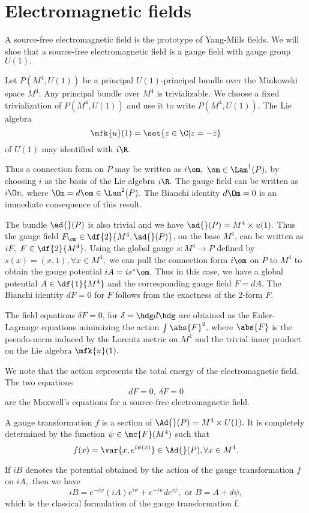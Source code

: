 \section{Electromagnetic fields}

A source-free electromagnetic field is the prototype of Yang-Mills fields. We will shoe that a source-free
electromagnetic field is a gauge field with gauge group $U(1).$

Let $P(M^{4}, U(1))$ be a principal $U(1)$-principal bundle over the Minkowski space $M^{4}.$ Any principal bundle over
$M^{4}$ is trivializable. We choose a fixed trivialization of $P(M^{4},U(1))$ and use it to write $P(M^{4}, U(1)).$ The
Lie algebra
$$
\mfk{u}(1)=\set{z \in \C | z = -\bar{z}}
$$
of $U(1)$ may identified with $i\R.$

Thus a connection form on $P$ may be written as $i \om,$ $\om \in \Lam^{1}(P),$ by choosing $i$ as the basis of the Lie
algebra $i\R.$ The gauge field can be written as $i  \Om,$ where $\Om = d\om \in \Lam^{2}(P).$ The Bianchi identity $d
\Om = 0$ is an immediate consequence of this result. 

The bundle $\ad{}(P)$ is also trivial and we have $\ad{}(P)=M^{4}\times u(1).$ Thus the gauge field $F_{\om} \in
\df{2}{M^{4}, \ad{}(P)}$, on the base $M^{4}$, can be written as $iF, \ F \in \df{2}{M^{4}}.$ Using the global gauge
$s:M^{4} \to P$ defined by $s(x)=(x,1), \forall x \in M^{4},$ we can pull the connection form $i \om$ on $P$ to $M^{4}$
to obtain the gauge potential $iA=is^{*}\om.$ Thus in this case, we have a global potential $A \in \df{1}{M^{4}}$ and
the corresponding gauge field $F=dA.$ The Bianchi identity $dF=0$ for $F$ follows  from the exactness of the 2-form $F.$

The field equations $\delta F=0$, for $\delta=\hdg d \hdg$ are obtained as the Euler-Lagrange equations minimizing the
action $\int \abs{F}^{2},$ where $\abs{F}$ is the pseudo-norm induced by the Lorentz metric on $M^{4}$ and the trivial
inner product on the Lie algebra $\mfk{u}(1).$

We note that the action represents the total energy of the electromagnetic field. The two equations 
\begin{equation}
 \label{MM:8.1}
dF=0, \ \delta F=0
\end{equation}
are the Maxwell's equations for a source-free electromagnetic field.

A gauge transformation $f$ is a section of $\Ad{}(P)=M^{4}\times U(1).$ It is completely determined by the function
$\psi \in \mc{F}(M^{4})$ such that 
$$
f(x)=\var{x, e^{i\psi(x)}} \in \Ad{}(P), \forall x \in M^{4}.
$$

If $iB$ denotes the potential obtained by the action of the gauge transformation $f$ on $iA,$ then we have
$$
iB=e^{-i\psi}(iA)e^{i\psi}+e^{-i\psi}d e^{i\psi},\text{ or }B=A+d\psi,
$$ 
which is the classical formulation of the gauge transformation f. 